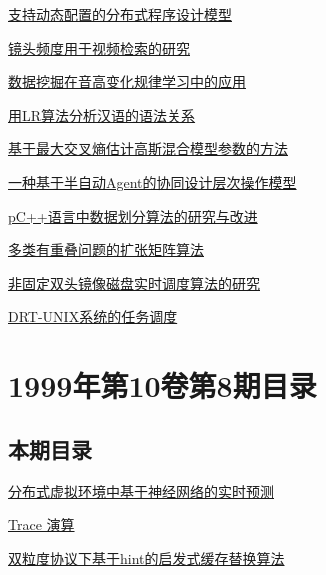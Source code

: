 \documentclass[a4paper]{article}
\begin{document}
\href{http://www.jos.org.cn/ch/reader/download_pdf.aspx?file_no=19990908&year_id=1999&quarter_id=9&falg=1}{支持动态配置的分布式程序设计模型}

\href{http://www.jos.org.cn/ch/reader/download_pdf.aspx?file_no=19990909&year_id=1999&quarter_id=9&falg=1}{镜头频度用于视频检索的研究}

\href{http://www.jos.org.cn/ch/reader/download_pdf.aspx?file_no=19990910&year_id=1999&quarter_id=9&falg=1}{数据挖掘在音高变化规律学习中的应用}

\href{http://www.jos.org.cn/ch/reader/download_pdf.aspx?file_no=19990911&year_id=1999&quarter_id=9&falg=1}{用LR算法分析汉语的语法关系}

\href{http://www.jos.org.cn/ch/reader/download_pdf.aspx?file_no=19990912&year_id=1999&quarter_id=9&falg=1}{基于最大交叉熵估计高斯混合模型参数的方法}

\href{http://www.jos.org.cn/ch/reader/download_pdf.aspx?file_no=19990913&year_id=1999&quarter_id=9&falg=1}{一种基于半自动Agent的协同设计层次操作模型}

\href{http://www.jos.org.cn/ch/reader/download_pdf.aspx?file_no=19990914&year_id=1999&quarter_id=9&falg=1}{pC++语言中数据划分算法的研究与改进}

\href{http://www.jos.org.cn/ch/reader/download_pdf.aspx?file_no=19990915&year_id=1999&quarter_id=9&falg=1}{多类有重叠问题的扩张矩阵算法}

\href{http://www.jos.org.cn/ch/reader/download_pdf.aspx?file_no=19990916&year_id=1999&quarter_id=9&falg=1}{非固定双头镜像磁盘实时调度算法的研究}

\href{http://www.jos.org.cn/ch/reader/download_pdf.aspx?file_no=19990917&year_id=1999&quarter_id=9&falg=1}{DRT-UNIX系统的任务调度}


\section{\textbf{1999年第10卷第8期目录}}
\subsection{本期目录}
\href{http://www.jos.org.cn/ch/reader/download_pdf.aspx?file_no=19990801&year_id=1999&quarter_id=8&falg=1}{分布式虚拟环境中基于神经网络的实时预测}

\href{http://www.jos.org.cn/ch/reader/download_pdf.aspx?file_no=19990802&year_id=1999&quarter_id=8&falg=1}{Trace 演算}

\href{http://www.jos.org.cn/ch/reader/download_pdf.aspx?file_no=19990803&year_id=1999&quarter_id=8&falg=1}{双粒度协议下基于hint的启发式缓存替换算法}
\end{document}
